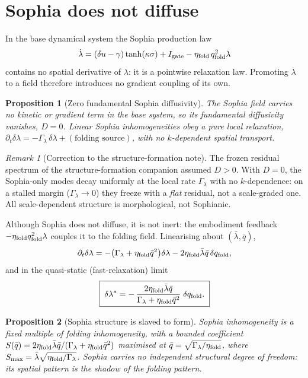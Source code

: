 \documentclass[11pt,a4paper,oneside]{book}
\newcommand{\qf}{q_{\rm fold}}
\newcommand{\Glam}{\Gamma_\lambda}
\newcommand{\etaf}{\eta_{\rm fold}}
\theoremstyle{plain}
\newtheorem{proposition}{Proposition}[chapter]
\theoremstyle{definition}
\theoremstyle{remark}
\newtheorem*{remark}{Remark}
\begin{document}
\section{Sophia does not diffuse}

In the base dynamical system the Sophia production law
\begin{equation}
\dot\lambda=(\delta u-\gamma)\tanh(\kappa\sigma)+I_{\rm gate}-\etaf\,\qf^{2}\lambda
\end{equation}
contains no spatial derivative of $\lambda$: it is a pointwise relaxation law. Promoting $\lambda$ to a
field therefore introduces no gradient coupling of its own.

\begin{proposition}[Zero fundamental Sophia diffusivity]\label{transportconstants:prop:D0}
The Sophia field carries no kinetic or gradient term in the base system, so its fundamental diffusivity
vanishes, $D=0$. Linear Sophia inhomogeneities obey a pure local relaxation,
$\partial_t\delta\lambda=-\Glam\,\delta\lambda+(\text{folding source})$, with no $k$-dependent spatial
transport.
\end{proposition}

\begin{remark}[Correction to the structure-formation note]
The frozen residual spectrum of the structure-formation companion assumed $D>0$. With $D=0$, the
Sophia-only modes decay uniformly at the local rate $\Glam$ with no $k$-dependence: on a stalled margin
($\Glam\to0$) they freeze with a \emph{flat} residual, not a scale-graded one. All scale-dependent
structure is morphological, not Sophianic.
\end{remark}

Although Sophia does not diffuse, it is not inert: the embodiment feedback $-\etaf\qf^{2}\lambda$ couples it
to the folding field. Linearising about $(\bar\lambda,\bar q)$,
\begin{equation}
\partial_t\delta\lambda=-\bigl(\Glam+\etaf\bar q^{2}\bigr)\delta\lambda-2\etaf\bar\lambda\bar q\,\delta\qf,
\end{equation}
and in the quasi-static (fast-relaxation) limit
\begin{equation}
\boxed{\;\delta\lambda^{\ast}=-\,\frac{2\etaf\bar\lambda\bar q}{\Glam+\etaf\bar q^{2}}\;\delta\qf .\;}
\end{equation}

\begin{proposition}[Sophia structure is slaved to form]\label{transportconstants:prop:slave}
Sophia inhomogeneity is a fixed multiple of folding inhomogeneity, with a bounded coefficient
$S(\bar q)=2\etaf\bar\lambda\bar q/(\Glam+\etaf\bar q^{2})$ maximised at
$\bar q=\sqrt{\Glam/\etaf}$, where $S_{\max}=\bar\lambda\sqrt{\etaf/\Glam}$. Sophia carries no independent
structural degree of freedom: its spatial pattern is the shadow of the folding pattern.
\end{proposition}
\end{document}
